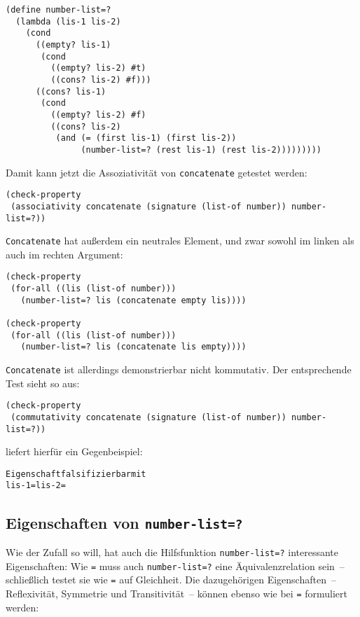 %
\begin{lstlisting}
(define number-list=?
  (lambda (lis-1 lis-2)
    (cond
      ((empty? lis-1)
       (cond
         ((empty? lis-2) #t)
         ((cons? lis-2) #f)))
      ((cons? lis-1)
       (cond
         ((empty? lis-2) #f)
         ((cons? lis-2)
          (and (= (first lis-1) (first lis-2))
               (number-list=? (rest lis-1) (rest lis-2)))))))))
\end{lstlisting}
%
Damit kann jetzt die Assoziativität von \lstinline{concatenate} getestet werden:
%
\begin{lstlisting}
(check-property
 (associativity concatenate (signature (list-of number)) number-list=?))
\end{lstlisting}
%
\lstinline{Concatenate} hat außerdem ein neutrales Element, und zwar
sowohl im linken als auch im rechten Argument:
%
\begin{lstlisting}
(check-property
 (for-all ((lis (list-of number)))
   (number-list=? lis (concatenate empty lis))))

(check-property
 (for-all ((lis (list-of number)))
   (number-list=? lis (concatenate lis empty))))
\end{lstlisting}
%
\lstinline{Concatenate} ist allerdings demonstrierbar nicht kommutativ.
Der entsprechende Test sieht so aus:
%
\begin{lstlisting}
(check-property
 (commutativity concatenate (signature (list-of number)) number-list=?))
\end{lstlisting}
%
\drscheme{} liefert hierfür ein Gegenbeispiel:
%
\begin{alltt}
Eigenschaft falsifizierbar mit
         lis-1 =  lis-2 = 
\end{alltt}

\subsection{Eigenschaften von \lstinline{number-list=?}}

Wie der Zufall so will, hat auch die Hilfsfunktion
\lstinline{number-list=?} interessante Eigenschaften: Wie \lstinline{=} muss
auch \lstinline{number-list=?} eine Äquivalenzrelation sein~--
schließlich testet sie wie \lstinline{=} auf Gleichheit.  Die
dazugehörigen Eigenschaften~-- Reflexivität, Symmetrie und
Transitivität~-- können ebenso wie bei \lstinline{=} formuliert werden:

